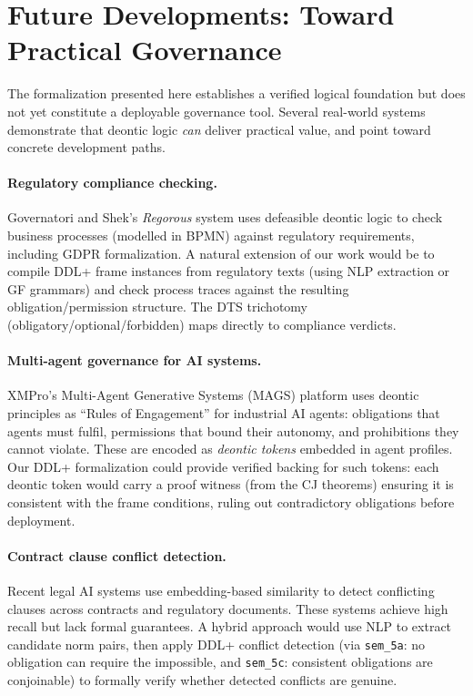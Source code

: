 \documentclass[]{article}
\newcommand{\code}[1]{\texttt{#1}}
\newcommand{\DDL}{\textup{DDL+}}
\newcommand{\DTS}{\textup{DTS}}
\begin{document}
\section{Future Developments: Toward Practical Governance}
\label{sec:future}

The formalization presented here establishes a verified logical foundation
but does not yet constitute a deployable governance tool.  Several
real-world systems demonstrate that deontic logic \emph{can} deliver
practical value, and point toward concrete development paths.

\paragraph{Regulatory compliance checking.}
Governatori and Shek's \emph{Regorous} system \cite{Governatori2013}
uses defeasible deontic logic to check business processes (modelled in
BPMN) against regulatory requirements, including GDPR formalization.
A natural extension of our work would be to compile \DDL{} frame
instances from regulatory texts (using NLP extraction or GF grammars)
and check process traces against the resulting obligation/permission
structure.  The \DTS{} trichotomy (obligatory/optional/forbidden) maps
directly to compliance verdicts.

\paragraph{Multi-agent governance for AI systems.}
XMPro's Multi-Agent Generative Systems (MAGS) platform \cite{XMProMAGS}
uses deontic principles as ``Rules of Engagement'' for industrial AI agents:
obligations that agents must fulfil, permissions that bound their autonomy,
and prohibitions they cannot violate.  These are encoded as \emph{deontic tokens}
embedded in agent profiles.  Our \DDL{} formalization could provide verified
backing for such tokens: each deontic token would carry a proof witness
(from the CJ theorems) ensuring it is consistent with the frame conditions,
ruling out contradictory obligations before deployment.

\paragraph{Contract clause conflict detection.}
Recent legal AI systems \cite{NormAI} use embedding-based similarity to
detect conflicting clauses across contracts and regulatory documents.
These systems achieve high recall but lack formal guarantees.
A hybrid approach would use NLP to extract candidate norm pairs,
then apply \DDL{} conflict detection (via \code{sem\_5a}: no obligation
can require the impossible, and \code{sem\_5c}: consistent obligations
are conjoinable) to formally verify whether detected conflicts are genuine.
\end{document}
